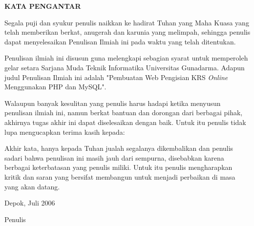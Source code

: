 \newpage %
\begin{center}
\begin{large}\textbf{KATA PENGANTAR}\\\end{large}
\end{center}
\vspace{5mm}
Segala puji dan syukur penulis naikkan ke hadirat Tuhan yang Maha Kuasa yang telah memberikan berkat, anugerah dan karunia yang melimpah, sehingga penulis dapat menyelesaikan Penulisan Ilmiah ini pada waktu yang telah ditentukan.

Penulisan ilmiah ini disusun guna melengkapi sebagian syarat untuk memperoleh gelar setara Sarjana Muda Teknik Informatika Universitas Gunadarma. Adapun judul Penulisan Ilmiah ini adalah "Pembuatan Web Pengisian KRS \emph{Online}\\ Menggunakan PHP dan MySQL".

Walaupun banyak kesulitan yang penulis harus hadapi ketika menyusun penulisan ilmiah ini, namun berkat bantuan dan dorongan dari berbagai pihak, akhirnya tugas akhir ini dapat diselesaikan dengan baik. Untuk itu penulis tidak lupa mengucapkan terima kasih kepada:


Akhir kata, hanya kepada Tuhan jualah segalanya dikembalikan dan penulis sadari bahwa penulisan ini masih jauh dari sempurna, disebabkan karena berbagai keterbatasan yang penulis miliki. Untuk itu penulis mengharapkan kritik dan saran yang bersifat membangun untuk menjadi perbaikan di masa yang akan datang.

\vspace{0.5 cm}
\begin{flushright}
Depok, Juli 2006

\vspace{1.5 cm}
Penulis
\end{flushright}